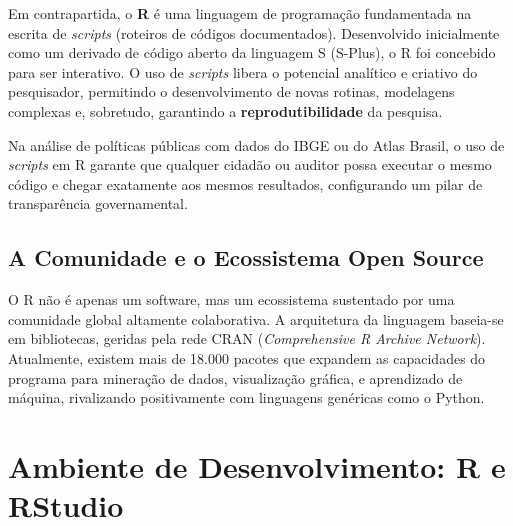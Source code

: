 \documentclass[
  brazilian,
  11pt,
  a4paper,
  open = right,
  twoside = true]{scrbook}
\begin{document}
Em contrapartida, o \textbf{R} é uma linguagem de programação
fundamentada na escrita de \emph{scripts} (roteiros de códigos
documentados). Desenvolvido inicialmente como um derivado de código
aberto da linguagem S (S-Plus), o R foi concebido para ser interativo. O
uso de \emph{scripts} libera o potencial analítico e criativo do
pesquisador, permitindo o desenvolvimento de novas rotinas, modelagens
complexas e, sobretudo, garantindo a \textbf{reprodutibilidade} da
pesquisa.

\begin{tcolorbox}[enhanced jigsaw, arc=.35mm, bottomrule=.15mm, bottomtitle=1mm, breakable, colback=white, colbacktitle=quarto-callout-important-color!10!white, colframe=quarto-callout-important-color-frame, coltitle=black, left=2mm, leftrule=.75mm, opacityback=0, opacitybacktitle=0.6, rightrule=.15mm, title=\textcolor{quarto-callout-important-color}{\faExclamation}\hspace{0.5em}{Reprodutibilidade como Princípio Ético}, titlerule=0mm, toprule=.15mm, toptitle=1mm]

Na análise de políticas públicas com dados do IBGE ou do Atlas Brasil, o
uso de \emph{scripts} em R garante que qualquer cidadão ou auditor possa
executar o mesmo código e chegar exatamente aos mesmos resultados,
configurando um pilar de transparência governamental.

\end{tcolorbox}

\section{A Comunidade e o Ecossistema Open
Source}\label{a-comunidade-e-o-ecossistema-open-source}

O R não é apenas um software, mas um ecossistema sustentado por uma
comunidade global altamente colaborativa. A arquitetura da linguagem
baseia-se em bibliotecas, geridas pela rede CRAN (\emph{Comprehensive R
Archive Network}). Atualmente, existem mais de 18.000 pacotes que
expandem as capacidades do programa para mineração de dados,
visualização gráfica, e aprendizado de máquina, rivalizando
positivamente com linguagens genéricas como o Python.

\chapter{Ambiente de Desenvolvimento: R e
RStudio}\label{ambiente-de-desenvolvimento-r-e-rstudio}
\end{document}
